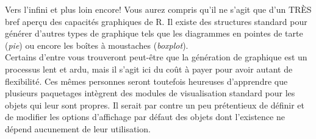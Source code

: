 \begin{moreInfo}{Vers l'infini et plus loin encore!}
	Vous aurez compris qu'il ne s'agit que d'un TRÈS bref aperçu des capacités graphiques de R. Il existe des structures standard pour générer d'autres types de graphique tels que les diagrammes en pointes de tarte (\emph{pie}) ou encore les boîtes à moustaches (\emph{boxplot}). \\
	Certains d'entre vous trouveront peut-être que la génération de graphique est un processus lent et ardu, mais il s'agit ici du coût à payer pour avoir autant de flexibilité. Ces mêmes personnes seront toutefois heureuses d'apprendre que plusieurs paquetages intègrent des modules de visualisation standard pour les objets qui leur sont propres.  Il serait par contre un peu prétentieux de définir et de modifier les options d’affichage par défaut des objets dont l’existence ne dépend aucunement de leur utilisation.
\end{moreInfo}